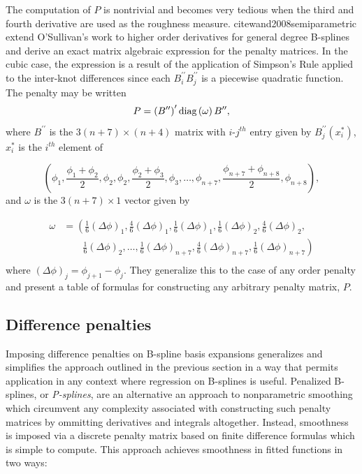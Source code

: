 \documentclass[12pt]{article}
\theoremstyle{definition}
\begin{document}
The computation of $P$ is nontrivial and becomes very tedious when the third and fourth derivative are used as the roughness measure. cite{wand2008semiparametric} extend O'Sullivan's work to higher order derivatives for general degree B-splines and derive an exact matrix algebraic expression for the penalty matrices. In the cubic case, the expression is a result of the application of Simpson's Rule applied to the inter-knot differences since each $B_i^{\prime \prime} B_j^{\prime \prime}$ is a piecewise quadratic function. The penalty may be written
 \[
 P = \left(B^{\prime \prime}\right)^\prime \textup{diag}\left(\omega \right) B^{\prime \prime}, 
 \]
 \noindent
 where $B^{\prime \prime}$ is the $3\left( n + 7 \right) \times \left( n + 4 \right)$ matrix with $i$-$j^{th}$ entry given by $B_j^{\prime \prime} \left(x_i^*\right)$, $x^*_i$ is the $i^{th}$ element of 
 
\[
\left( \phi_1,\frac{\phi_1+\phi_2}{2},\phi_2,\phi_2,\frac{\phi_2+\phi_3}{2},\phi_3,\dots,\phi_{n+7},\frac{\phi_{n+7}+\phi_{n+8}}{2},\phi_{n+8} \right),
\]
 \noindent
 and $\omega$ is the $3\left(n+7\right) \times 1$ vector given by
 
\begin{align*}
\omega &= \left( \frac{1}{6}\left(\Delta \phi \right)_1,\frac{4}{6}\left(\Delta \phi \right)_1, \frac{1}{6}\left(\Delta \phi \right)_1,\frac{1}{6}\left(\Delta \phi \right)_2, \frac{4}{6}\left(\Delta \phi \right)_2,  \right. \\
&\qquad   \left. {} \frac{1}{6}\left(\Delta \phi \right)_2 , \dots , \frac{1}{6}\left(\Delta \phi \right)_{n+7}, \frac{4}{6}\left(\Delta \phi \right)_{n+7}, \frac{1}{6}\left(\Delta \phi \right)_{n+7}  \right) \\
\end{align*}
\noindent
 where $\left(\Delta \phi \right)_j = \phi_{j+1}-\phi_j$. They generalize this to the case of any order penalty and present a table of formulas for constructing any arbitrary penalty matrix, $P$.
 
 
 \subsection{Difference penalties}
 
Imposing difference penalties on B-spline basis expansions generalizes and simplifies the approach outlined in the previous section in a way that permits application in any context where regression on B-splines is useful. Penalized B-splines, or \emph{P-splines}, are an alternative an approach to nonparametric smoothing which circumvent any complexity associated with constructing such penalty matrices by ommitting derivatives and integrals altogether. Instead, smoothness is imposed via a discrete penalty matrix based on finite difference formulas which is simple to compute. This approach achieves smoothness in fitted functions in two ways:
\end{document}
